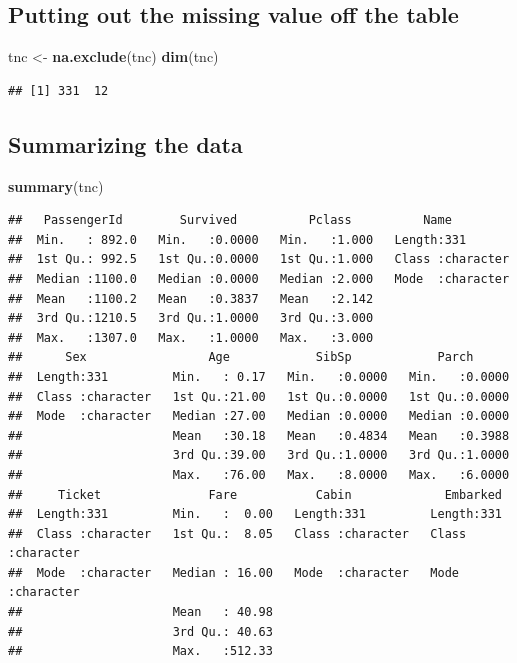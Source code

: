 \documentclass[
]{article}
\newenvironment{Shaded}{\begin{snugshade}}{\end{snugshade}}
\newcommand{\FunctionTok}[1]{\textcolor[rgb]{1.00,0.58,0.35}{\textbf{#1}}}
\newcommand{\NormalTok}[1]{\textcolor[rgb]{0.74,0.68,0.62}{#1}}
\newcommand{\OtherTok}[1]{\textcolor[rgb]{0.74,0.68,0.62}{#1}}
\begin{document}
\hypertarget{putting-out-the-missing-value-off-the-table}{%
\subsection{Putting out the missing value off the
table}\label{putting-out-the-missing-value-off-the-table}}

\begin{Shaded}
\begin{Highlighting}[]
\NormalTok{tnc }\OtherTok{\textless{}{-}} \FunctionTok{na.exclude}\NormalTok{(tnc)}
\FunctionTok{dim}\NormalTok{(tnc)}
\end{Highlighting}
\end{Shaded}

\begin{verbatim}
## [1] 331  12
\end{verbatim}

\hypertarget{summarizing-the-data}{%
\subsection{Summarizing the data}\label{summarizing-the-data}}

\begin{Shaded}
\begin{Highlighting}[]
\FunctionTok{summary}\NormalTok{(tnc)}
\end{Highlighting}
\end{Shaded}

\begin{verbatim}
##   PassengerId        Survived          Pclass          Name          
##  Min.   : 892.0   Min.   :0.0000   Min.   :1.000   Length:331        
##  1st Qu.: 992.5   1st Qu.:0.0000   1st Qu.:1.000   Class :character  
##  Median :1100.0   Median :0.0000   Median :2.000   Mode  :character  
##  Mean   :1100.2   Mean   :0.3837   Mean   :2.142                     
##  3rd Qu.:1210.5   3rd Qu.:1.0000   3rd Qu.:3.000                     
##  Max.   :1307.0   Max.   :1.0000   Max.   :3.000                     
##      Sex                 Age            SibSp            Parch       
##  Length:331         Min.   : 0.17   Min.   :0.0000   Min.   :0.0000  
##  Class :character   1st Qu.:21.00   1st Qu.:0.0000   1st Qu.:0.0000  
##  Mode  :character   Median :27.00   Median :0.0000   Median :0.0000  
##                     Mean   :30.18   Mean   :0.4834   Mean   :0.3988  
##                     3rd Qu.:39.00   3rd Qu.:1.0000   3rd Qu.:1.0000  
##                     Max.   :76.00   Max.   :8.0000   Max.   :6.0000  
##     Ticket               Fare           Cabin             Embarked        
##  Length:331         Min.   :  0.00   Length:331         Length:331        
##  Class :character   1st Qu.:  8.05   Class :character   Class :character  
##  Mode  :character   Median : 16.00   Mode  :character   Mode  :character  
##                     Mean   : 40.98                                        
##                     3rd Qu.: 40.63                                        
##                     Max.   :512.33
\end{verbatim}
\end{document}
